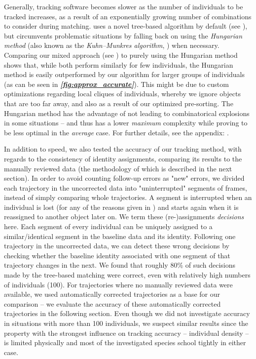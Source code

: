 \documentclass[9pt,lineno]{elife}
\newcommand{\figref}[1]{\textit{\textbf{\ref{#1}}}}
\newcommand{\TRex}{\protect\path{TRex}}
\newcommand{\changemade}[1]{#1}
\begin{document}
Generally, tracking software becomes slower as the number of individuals to be tracked increases, as a result of an exponentially growing number of combinations to consider during matching. \changemade{\TRex{} uses a novel tree-based algorithm by default (see \nameref{sec:tracking}), but circumvents problematic situations by falling back on using the \textit{Hungarian method} (also known as the \textit{Kuhn–Munkres algorithm}, \cite{kuhn1955hungarian})} when necessary. Comparing our mixed approach (see ) to purely using the Hungarian method shows that, while both perform similarly for few individuals, the Hungarian method is easily outperformed by our algorithm for larger groups of individuals (as can be seen in \figref{fig:approx_accurate}). This might be due to custom optimizations regarding local cliques of individuals, whereby we ignore objects that are too far away, and also as a result of our optimized pre-sorting. The Hungarian method has the advantage of not leading to combinatorical explosions in some situations -- and thus has a lower \textit{maximum} complexity while proving to be less optimal in the \textit{average} case. For further details, see the appendix: .

 \label{sec:evaluation_accuracy}
In addition to speed, we also tested the accuracy of our tracking method, with regards to the consistency of identity assignments, comparing its results to the manually reviewed data (the methodology of which is described in the next section). In order to avoid counting follow-up errors as "new" errors, we divided each trajectory in the uncorrected data into "uninterrupted" segments of frames, instead of simply comparing whole trajectories. A segment is interrupted when an individual is lost (for any of the reasons given in ) and starts again when it is reassigned to another object later on. We term these (re-)assignments \textit{decisions} here. Each segment of every individual can be uniquely assigned to a similar/identical segment in the baseline data and its identity. Following one trajectory in the uncorrected data, we can detect these wrong decisions by checking whether the baseline identity associated with one segment of that trajectory changes in the next. We found that roughly 80\% of such decisions made by the tree-based matching were correct, even with relatively high numbers of individuals (100). For trajectories where no manually reviewed data were available, we used automatically corrected trajectories as a base for our comparison -- we evaluate the accuracy of these automatically corrected trajectories in the following section. Even though we did not investigate accuracy in situations with more than 100 individuals, we suspect similar results since the property with the strongest influence on tracking accuracy -- individual density -- is limited physically and most of the investigated species school tightly in either case.
\end{document}
